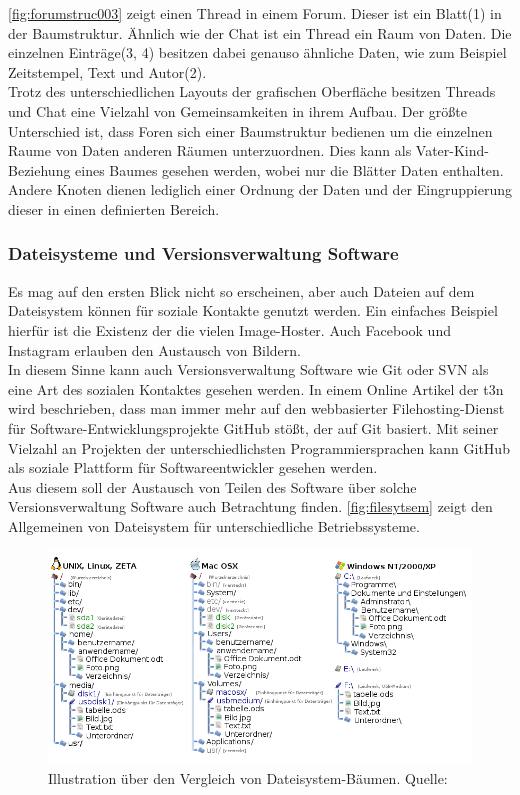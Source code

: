 \documentclass[a4paper]{article}
\begin{document}
	\autoref{fig:forumstruc003} zeigt einen Thread in einem Forum. Dieser ist
	ein Blatt(1) in der Baumstruktur. Ähnlich wie der Chat ist ein Thread ein
	Raum von Daten. Die einzelnen Einträge(3, 4) besitzen dabei genauso 
	ähnliche Daten,	wie zum Beispiel Zeitstempel, Text und Autor(2). \\
	
	Trotz des unterschiedlichen Layouts der grafischen Oberfläche besitzen
	Threads und Chat eine Vielzahl von Gemeinsamkeiten in ihrem Aufbau. Der
	größte Unterschied ist, dass Foren sich einer Baumstruktur bedienen um
	die einzelnen Raume von Daten anderen Räumen unterzuordnen. Dies kann
	als Vater-Kind-Beziehung eines Baumes gesehen werden, wobei nur die Blätter
	Daten enthalten. Andere Knoten dienen lediglich einer Ordnung der Daten und 
	der Eingruppierung dieser in einen definierten Bereich.
	
	\subsubsection{Dateisysteme und Versionsverwaltung Software}	
	
	Es mag auf den ersten Blick nicht so erscheinen, aber auch Dateien auf
	dem Dateisystem können für soziale Kontakte genutzt werden. Ein einfaches
	Beispiel hierfür ist die Existenz der die vielen Image-Hoster. Auch 
	Facebook und Instagram erlauben den Austausch von Bildern. \\
	
	In diesem Sinne kann auch Versionsverwaltung Software wie Git oder SVN als
	eine Art des sozialen Kontaktes gesehen werden. In einem Online Artikel der
	t3n \cite{articleGitHub} wird beschrieben, dass man immer mehr auf den
	webbasierter Filehosting-Dienst für Software-Entwicklungsprojekte GitHub
	\cite{gitHub} stößt, der auf Git basiert. Mit seiner Vielzahl an Projekten
	der unterschiedlichsten Programmiersprachen kann GitHub als soziale Plattform
	für Softwareentwickler gesehen werden. \\
	
	Aus diesem soll der Austausch von Teilen des Software über solche 
	Versionsverwaltung Software auch Betrachtung finden. \autoref{fig:filesytsem}
	zeigt den Allgemeinen von Dateisystem für unterschiedliche Betriebssysteme.
	
	\begin{figure}[H] 
		\includegraphics[width=\linewidth]{../Bilder/filesystem.png}
		\caption{
			Illustration über den Vergleich von Dateisystem-Bäumen.
			Quelle: \cite{filesytsem}
		}
		\label{fig:filesytsem}
	\end{figure}
	
\end{document}
